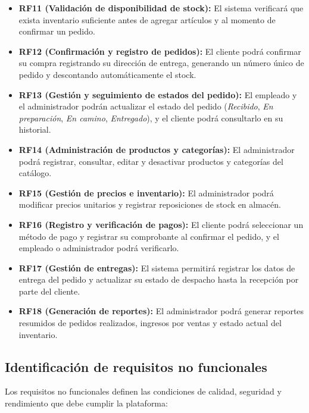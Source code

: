 \begin{itemize}
    \item \textbf{RF11 (Validación de disponibilidad de stock):} El sistema verificará que exista inventario suficiente antes de agregar artículos y al momento de confirmar un pedido.
    \item \textbf{RF12 (Confirmación y registro de pedidos):} El cliente podrá confirmar su compra registrando su dirección de entrega, generando un número único de pedido y descontando automáticamente el stock.
    \item \textbf{RF13 (Gestión y seguimiento de estados del pedido):} El empleado y el administrador podrán actualizar el estado del pedido (\textit{Recibido}, \textit{En preparación}, \textit{En camino}, \textit{Entregado}), y el cliente podrá consultarlo en su historial.
    \item \textbf{RF14 (Administración de productos y categorías):} El administrador podrá registrar, consultar, editar y desactivar productos y categorías del catálogo.
    \item \textbf{RF15 (Gestión de precios e inventario):} El administrador podrá modificar precios unitarios y registrar reposiciones de stock en almacén.
    \item \textbf{RF16 (Registro y verificación de pagos):} El cliente podrá seleccionar un método de pago y registrar su comprobante al confirmar el pedido, y el empleado o administrador podrá verificarlo.
    \item \textbf{RF17 (Gestión de entregas):} El sistema permitirá registrar los datos de entrega del pedido y actualizar su estado de despacho hasta la recepción por parte del cliente.
    \item \textbf{RF18 (Generación de reportes):} El administrador podrá generar reportes resumidos de pedidos realizados, ingresos por ventas y estado actual del inventario.
\end{itemize}

\subsection{Identificación de requisitos no funcionales}
Los requisitos no funcionales definen las condiciones de calidad, seguridad y rendimiento que debe cumplir la plataforma:

